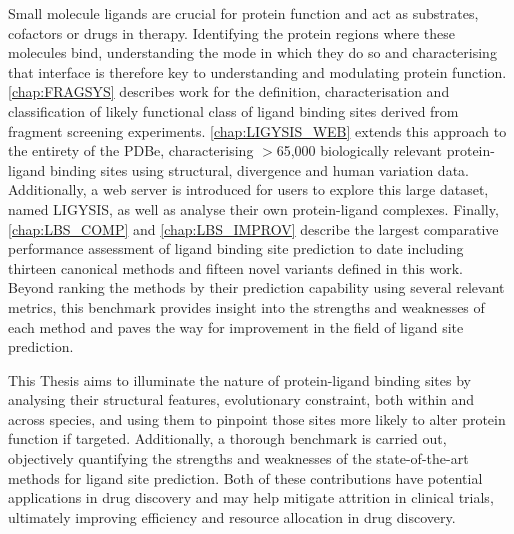 Small molecule ligands are crucial for protein function and act as substrates, cofactors or drugs in therapy. Identifying the protein regions where these molecules bind, understanding the mode in which they do so and characterising that interface is therefore key to understanding and modulating protein function. \autoref{chap:FRAGSYS} describes work for the definition, characterisation and classification of likely functional class of ligand binding sites derived from fragment screening experiments. \autoref{chap:LIGYSIS_WEB} extends this approach to the entirety of the PDBe, characterising $>$65,000 biologically relevant protein-ligand binding sites using structural, divergence and human variation data. Additionally, a web server is introduced for users to explore this large dataset, named LIGYSIS, as well as analyse their own protein-ligand complexes. Finally, \autoref{chap:LBS_COMP} and \autoref{chap:LBS_IMPROV} describe the largest comparative performance assessment of ligand binding site prediction to date including thirteen canonical methods and fifteen novel variants defined in this work. Beyond ranking the methods by their prediction capability using several relevant metrics, this benchmark provides insight into the strengths and weaknesses of each method and paves the way for improvement in the field of ligand site prediction.

This Thesis aims to illuminate the nature of protein-ligand binding sites by analysing their structural features, evolutionary constraint, both within and across species, and using them to pinpoint those sites more likely to alter protein function if targeted. Additionally, a thorough benchmark is carried out, objectively quantifying the strengths and weaknesses of the state-of-the-art methods for ligand site prediction. Both of these contributions have potential applications in drug discovery and may help mitigate attrition in clinical trials, ultimately improving efficiency and resource allocation in drug discovery.
